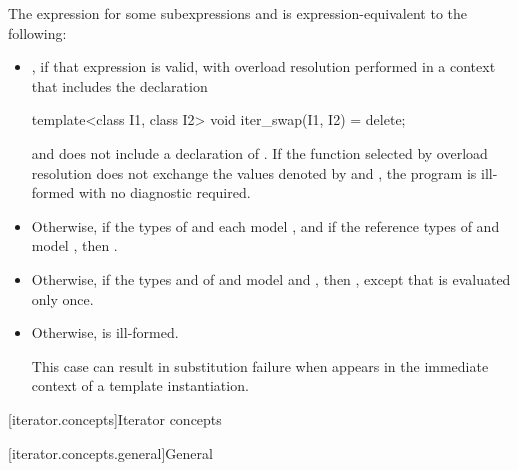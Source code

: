 \pnum
The expression  for some subexpressions
 and  is expression-equivalent to the following:

\begin{itemize}
\item {}, if that expression is valid,
with overload resolution performed in a context that includes the declaration
\begin{codeblock}
template<class I1, class I2>
  void iter_swap(I1, I2) = delete;
\end{codeblock}
and does not include a declaration of .
If the function selected by overload resolution does not exchange the values
denoted by  and , the program is
ill-formed with no diagnostic required.

\item Otherwise, if the types of  and  each model
, and if the reference types of  and 
model ,
then .

\item Otherwise, if the types  and  of  and
 model  and
, then
,
except that  is evaluated only once.

\item Otherwise,  is ill-formed.
\begin{note}
This case can result in substitution failure when 
appears in the immediate context of a template instantiation.
\end{note}
\end{itemize}

[iterator.concepts]{Iterator concepts}

[iterator.concepts.general]{General}

